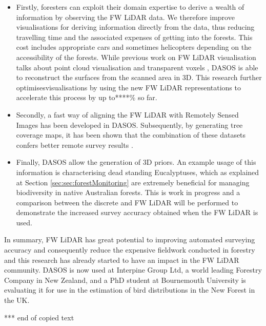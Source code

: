 \documentclass{subfiles}
\begin{document}
\begin{itemize}
\item Firstly, foresters can exploit their domain expertise to derive a wealth of information by observing the FW LiDAR data. We therefore improve visualisations for deriving information directly from the data, thus reducing travelling time and the associated expenses of getting into the forests. This cost includes appropriate cars and sometimes helicopters depending on the accessibility of the forests. While previous work on FW LiDAR visualisation talks about point cloud visualisation \cite{Isenburg2012Pulsewaves} and transparent voxels \cite{Persson2005}, DASOS is able to reconstruct the surfaces from the scanned area in 3D. This research further optimisesvisualisations by using the new FW LiDAR representations to accelerate this process by up to****\% so far.

\item Secondly, a fast way of aligning the FW LiDAR with Remotely Sensed Images has been developed in DASOS. Subsequently, by generating tree coverage maps, it has been shown that the combination of these datasets confers better remote survey results \cite{Miltiadou2015}.


\item {\color{gray} Finally, DASOS allow the generation of 3D priors. An example usage of this information is characterising dead standing Eucalyptuses, which as explained at Section \ref{sec:sec:forestMonitoring} are extremely beneficial for managing biodiversity in native Australian forests. This is work in progress and a comparison between the discrete and FW LiDAR will be performed to demonstrate the increased survey accuracy obtained when the FW LiDAR is used.}

\end{itemize}



\par In summary, FW LiDAR has great potential to improving automated surveying accuracy and consequently reduce the expensive fieldwork conducted in forestry and this research has already started to have an impact in the FW LiDAR community. DASOS is now used at Interpine Group Ltd, a world leading Forestry Company in New Zealand, and a PhD student at Bournemouth University is evaluating it for use in the estimation of bird distributions in the New Forest in the UK.

	
	\par {\color{red} *** end of copied text}
	
\end{document}
